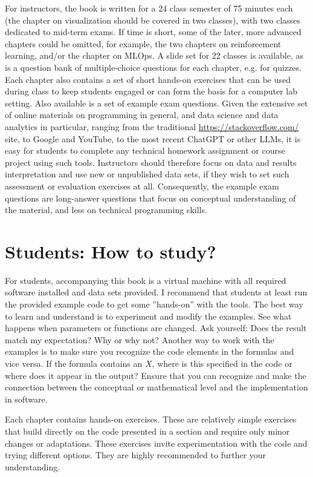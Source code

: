 For instructors, the book is written for a 24 class semester of 75 minutes each (the chapter on visualization should be covered in two classes), with two classes dedicated to mid-term exams. If time is short, some of the later, more advanced chapters could be omitted, for example, the two chapters on reinforcement learning, and/or the chapter on MLOps. A slide set for 22 classes is available, as is a question bank of multiple-choice questions for each chapter, e.g. for quizzes. Each chapter also contains a set of short hands-on exercises that can be used during class to keep students engaged or can form the basis for a computer lab setting. Also available is a set of example exam questions. Given the extensive set of online materials on programming in general, and data science and data analytics in particular, ranging from the traditional \href{Stack Overflow}{https://stackoverflow.com/} site, to Google and YouTube, to the most recent ChatGPT or other LLMs, it is easy for students to complete any technical homework assignment or course project using such tools. Instructors should therefore focus on data and results interpretation and use new or unpublished data sets, if they wish to set such assessment or evaluation exercises at all. Consequently, the example exam questions are long-answer questions that focus on conceptual understanding of the material, and less on technical programming skills.

\section*{Students: How to study?}

For students, accompanying this book is a virtual machine with all required software installed and data sets provided. I recommend that students at least run the provided example code to get some ''hands-on'' with the tools. The best way to learn and understand is to experiment and modify the examples. See what happens when parameters or functions are changed. Ask yourself: Does the result match my expectation? Why or why not? Another way to work with the examples is to make sure you recognize the code elements in the formulas and vice versa. If the formula contains an $X$, where is this specified in the code or where does it appear in the output? Ensure that you can recognize and make the connection between the conceptual or mathematical level and the implementation in software.

Each chapter contains hands-on exercises. These are relatively simple exercises that build directly on the code presented in a section and require only minor changes or adaptations. These exercises invite experimentation with the code and trying different options. They are highly recommended to further your understanding.

